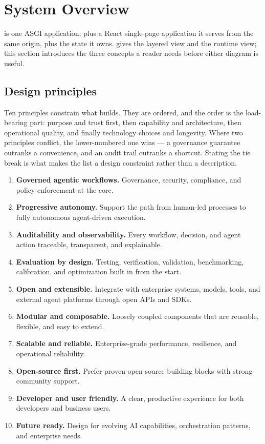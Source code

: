 \section{System Overview}
\label{sec:overview}




\sys is one ASGI application, plus a React single-page application it serves from
the same origin, plus the state it owns.  gives the layered
view and  the runtime view; this section introduces the three
concepts a reader needs before either diagram is useful.

\subsection{Design principles}
\label{sec:principles}

Ten principles constrain what \sys{} builds. They are ordered, and the order is
the load-bearing part: purpose and trust first, then capability and architecture,
then operational quality, and finally technology choices and longevity. Where two
principles conflict, the lower-numbered one wins --- a governance guarantee
outranks a convenience, and an audit trail outranks a shortcut. Stating the tie
break is what makes the list a design constraint rather than a description.

\begin{enumerate}
\item \textbf{Governed agentic workflows.} Governance, security, compliance, and
      policy enforcement at the core.
\item \textbf{Progressive autonomy.} Support the path from human-led processes to
      fully autonomous agent-driven execution.
\item \textbf{Auditability and observability.} Every workflow, decision, and agent
      action traceable, transparent, and explainable.
\item \textbf{Evaluation by design.} Testing, verification, validation,
      benchmarking, calibration, and optimization built in from the start.
\item \textbf{Open and extensible.} Integrate with enterprise systems, models,
      tools, and external agent platforms through open APIs and SDKs.
\item \textbf{Modular and composable.} Loosely coupled components that are
      reusable, flexible, and easy to extend.
\item \textbf{Scalable and reliable.} Enterprise-grade performance, resilience,
      and operational reliability.
\item \textbf{Open-source first.} Prefer proven open-source building blocks with
      strong community support.
\item \textbf{Developer and user friendly.} A clear, productive experience for
      both developers and business users.
\item \textbf{Future ready.} Design for evolving AI capabilities, orchestration
      patterns, and enterprise needs.
\end{enumerate}

